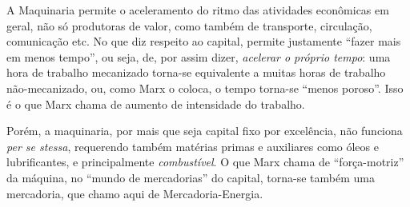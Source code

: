 \documentclass[12pt]{article}
\numberwithin{equation}{section}
\theoremstyle{plain}
\theoremstyle{definition}
\theoremstyle{remark}
\begin{document}
A Maquinaria permite o aceleramento do ritmo das atividades econômicas em geral, não só produtoras de valor, como também de transporte, circulação, comunicação etc. No que diz respeito ao capital, permite justamente ``fazer mais em menos tempo'', ou seja, de, por assim dizer, \textit{acelerar o próprio tempo}: uma hora de trabalho mecanizado torna-se equivalente a muitas horas de trabalho não-mecanizado, ou, como Marx o coloca, o tempo torna-se ``menos poroso''. Isso é o que Marx chama de aumento de intensidade do trabalho. 

Porém, a maquinaria, por mais que seja capital fixo por excelência, não funciona \textit{per se stessa}, requerendo também matérias primas e auxiliares como óleos e lubrificantes, e principalmente \textit{combustível}. O que Marx chama de ``força-motriz'' da máquina, no ``mundo de mercadorias'' do capital, torna-se também uma mercadoria, que chamo aqui de Mercadoria-Energia. 
\end{document}
